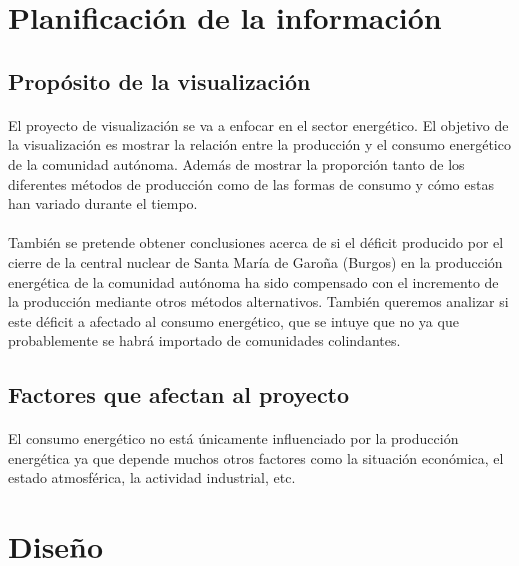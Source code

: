 \documentclass{article}
\begin{document}
	\section{Planificación de la información}

		\subsection{Propósito de la visualización}

			\paragraph{}
			El proyecto de visualización se va a enfocar en el sector energético. El objetivo de la visualización es mostrar la relación entre la producción y el consumo energético de la comunidad autónoma. Además de mostrar la proporción tanto de los diferentes métodos de producción como de las formas de consumo y cómo estas han variado durante el tiempo.

			\paragraph{}
			También se pretende obtener conclusiones acerca de si el déficit producido por el cierre de la central nuclear de Santa María de Garoña (Burgos) en la producción energética de la comunidad autónoma ha sido compensado con el incremento de la producción mediante otros métodos alternativos. También queremos analizar si este déficit a afectado al consumo energético, que se intuye que no ya que probablemente se habrá importado de comunidades colindantes.

		\subsection{Factores que afectan al proyecto}

			\paragraph{}
			El  consumo energético no está únicamente influenciado por la producción energética ya que depende muchos otros factores como la situación económica, el estado atmosférica, la actividad industrial, etc.


	\section{Diseño}
\end{document}
